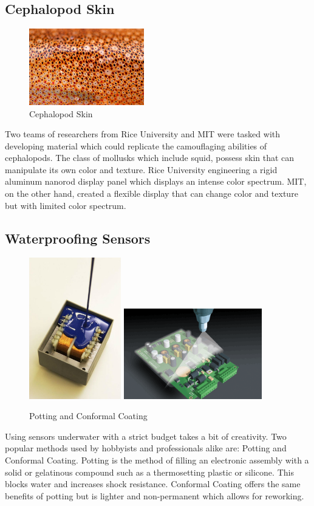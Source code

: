 \documentclass{report}
\begin{document}
\subsection{Cephalopod Skin}
\begin{figure}[h]
\centering
\includegraphics[width=5cm]{"Cephalopod Skin"}
\caption{Cephalopod Skin}
\end{figure}
Two teams of researchers from Rice University and MIT were tasked with developing material which could replicate the camouflaging abilities of cephalopods.  The class of mollusks which include squid, possess skin that can manipulate its own color and texture.  Rice University engineering a rigid aluminum nanorod display panel which displays an intense color spectrum.  MIT, on the other hand, created a flexible display that can change color and texture but with limited color spectrum.

\subsection{Waterproofing Sensors}
\begin{figure}[h]
\centering
\includegraphics[width=4cm]{"Potting"}
\includegraphics[width=6cm]{"Conformal Coating"}
\caption{Potting and Conformal Coating}
\end{figure}
Using sensors underwater with a strict budget takes a bit of creativity.  Two popular methods used by hobbyists and professionals alike are: Potting and Conformal Coating.  Potting is the method of filling an electronic assembly with a solid or gelatinous compound such as a thermosetting plastic or silicone.  This blocks water and increases shock resistance.  Conformal Coating offers the same benefits of potting but is lighter and non-permanent which allows for reworking.
\end{document}
